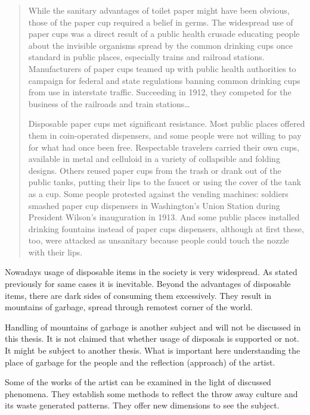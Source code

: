 \begin{quote}
While the sanitary advantages of toilet paper might have been obvious, those of the paper cup required a belief in germs. The widespread use of paper cups was a direct result of a public health crusade educating people about the invisible organisms spread by the common drinking cups once standard in public places, especially trains and railroad stations. Manufacturers of paper cups teamed up with public health authorities to campaign for federal and state regulations banning common drinking cups from use in interstate traffic. Succeeding in 1912, they competed for the business of the railroads and train stations\ldots 

Disposable paper cups met significant resistance. Most public places offered them in coin-operated dispensers, and some people were not willing to pay for what had once been free. Respectable travelers carried their own cups, available in metal and celluloid in a variety of collapsible and folding designs. Others reused paper cups from the trash or drank out of the public tanks, putting their lips to the faucet or using the cover of the tank as a cup. Some people protested against the vending machines: soldiers smashed paper cup dispensers in Washington’s Union Station during President Wilson’s inauguration in 1913. And some public places installed drinking fountains instead of paper cups dispensers, although at first these, too, were attacked as unsanitary because people could touch the nozzle with their lips.
\end{quote}

Nowadays usage of disposable items in the society is very widespread. As stated previously for same cases it is inevitable. Beyond the advantages of disposable items, there are dark sides of consuming them excessively. They result in mountains of garbage, spread through remotest corner of the world.

Handling of mountains of garbage is another subject and will not be discussed in this thesis. It is not claimed that whether usage of disposals is supported or not. It might be subject to another thesis. What is important here understanding the place of garbage for the people and the reflection (approach) of the artist. 



Some of the works of the artist can be examined in the light of discussed phenomena. They establish some methods to reflect the throw away culture and its waste generated patterns. They offer new dimensions to see the subject.

